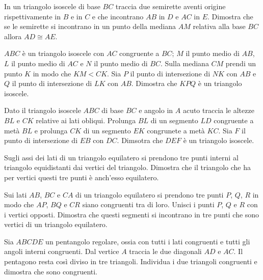 \begin{multicols}{2}
\begin{esercizio}
\label{ese:2.89}
In un triangolo isoscele di base $BC$ traccia due semirette aventi origine rispettivamente in $B$ e in $C$ e che incontrano $AB$ in $D$ e $AC$ in $E$. Dimostra che se le semirette si incontrano in un punto della mediana $AM$ relativa alla base $BC$ allora $AD\cong AE$.
\end{esercizio}

\begin{esercizio}
\label{ese:2.90}
$ABC$ è un triangolo isoscele con $AC$ congruente a $BC$; $M$ il punto medio di $AB$, $L$ il punto medio di $AC$ e $N$ il punto medio di $BC$. Sulla mediana $CM$ prendi un punto $K$ in modo che $KM<CK$. Sia $P$ il punto di intersezione di $NK$ con $AB$ e $Q$ il punto di intersezione di $LK$ con $AB$. Dimostra che $KPQ$ è un triangolo isoscele.
\end{esercizio}

\begin{esercizio}
\label{ese:2.91}
Dato il triangolo isoscele $ABC$ di base $BC$ e angolo in $A$ acuto traccia le altezze $BL$ e $CK$ relative ai lati obliqui. Prolunga $BL$ di un segmento $LD$ congruente a metà $BL$ e prolunga $CK$ di un segmento $EK$ congrunete a metà $KC$. Sia $F$ il punto di intersezione di $EB$ con $DC$. Dimsotra che $DEF$ è un triangolo isoscele.
\end{esercizio}

\begin{esercizio}
\label{ese:2.92}
Sugli assi dei lati di un triangolo equilatero si prendono tre punti interni al triangolo equidistanti dai vertici del triangolo. Dimostra che il triangolo che ha per vertici questi tre punti è anch'esso equilatero.
\end{esercizio}

\begin{esercizio}
\label{ese:2.93}
Sui lati $AB$, $BC$ e $CA$ di un triangolo equilatero si prendono tre punti $P$, $Q$, $R$ in modo che $AP$, $BQ$ e $CR$ siano congruenti tra di loro. Unisci i punti $P$, $Q$ e $R$ con i vertici opposti. Dimostra che questi segmenti si incontrano in tre punti che sono vertici di un triangolo equilatero.
\end{esercizio}

\begin{esercizio}
\label{ese:2.94}
Sia $ABCDE$ un pentangolo regolare, ossia con tutti i lati congruenti e tutti gli angoli interni congruenti. Dal vertice $A$ traccia le due diagonali $AD$ e $AC$. Il pentagono resta così diviso in tre triangoli. Individua i due triangoli congruenti e dimostra che sono congruenti.
\end{esercizio}


\end{multicols}
